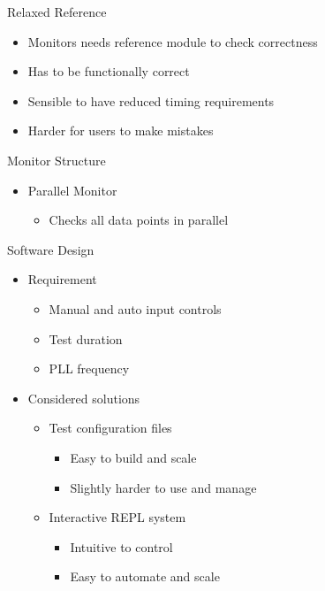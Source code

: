 \documentclass[t]{beamer}
\begin{document}
\begin{frame}{Relaxed Reference}
  \begin{itemize}
    \item Monitors needs reference module to check correctness
    \item Has to be functionally correct
    \item Sensible to have reduced timing requirements
    \item Harder for users to make mistakes
  \end{itemize}
\end{frame}

\begin{frame}{Monitor Structure}
  \begin{itemize}
    \item Parallel Monitor
    \begin{itemize}
      \item Checks all data points in parallel
    \end{itemize}
  \end{itemize}
  \begin{figure}[H]
    \centering
    \resizebox{0.8\textwidth}{!}{%
      
    }
  \end{figure}
\end{frame}


\begin{frame}{Software Design}
  \begin{itemize}
    \item<+-> Requirement
    \begin{itemize}
      \item Manual and auto input controls
      \item Test duration
      \item PLL frequency \newline
    \end{itemize}
    \item<+-> Considered solutions
    \begin{itemize}
      \item Test configuration files
      \begin{itemize}
        \item Easy to build and scale
        \item Slightly harder to use and manage
      \end{itemize}
      \item Interactive REPL system
      \begin{itemize}
        \item Intuitive to control
        \item Easy to automate and scale
      \end{itemize}
    \end{itemize}
  \end{itemize}
\end{frame}
\end{document}
